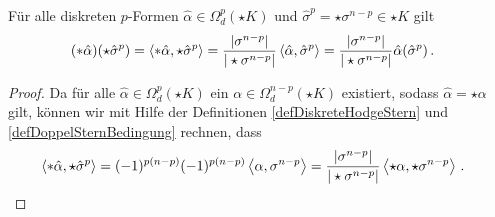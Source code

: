   \begin{folgerung}
    Für alle diskreten \( p \)-Formen \( \hat\alpha\in\Omega^{p}_{d}(\star K) \) und \( \hat\sigma^{p}=\star\sigma^{n-p}\in\star K \) gilt
    \begin{align}
      (*\hat\alpha)(\star\hat\sigma^{p}) &= \left\langle *\hat\alpha, \star\hat\sigma^{p} \right\rangle 
                                        = \frac{|\sigma^{n-p}|}{|\star\sigma^{n-p}|} \left\langle \hat\alpha, \hat\sigma^{p} \right\rangle
                                         = \frac{|\sigma^{n-p}|}{|\star\sigma^{n-p}|} \hat\alpha(\hat\sigma^{p}) \,\text{.}
    \end{align}
  \end{folgerung}
  \begin{proof}
    Da für alle \( \hat\alpha\in\Omega^{p}_{d}(\star K) \) ein \( \alpha\in\Omega^{n-p}_{d}(\star K) \) existiert,
    sodass \( \hat\alpha = \star\alpha \) gilt, können wir mit Hilfe der Definitionen
    \ref{defDiskreteHodgeStern} und \ref{defDoppelSternBedingung} rechnen, dass
    \begin{align}
      \left\langle *\hat\alpha, \star\hat\sigma^{p} \right\rangle
        &= (-1)^{p(n-p)} (-1)^{p(n-p)} \left\langle \alpha , \sigma^{n-p} \right\rangle
         = \frac{|\sigma^{n-p}|}{|\star\sigma^{n-p}|} \left\langle \star\alpha, \star\sigma^{n-p} \right\rangle \,\text{.}
    \end{align}
  \end{proof}
  
